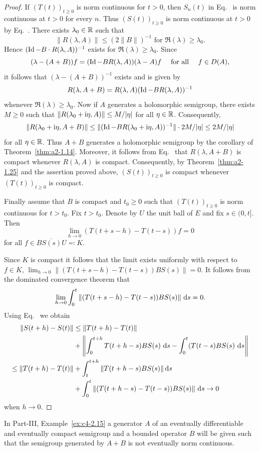\begin{proof}
If\/ $(T(t))_{t \geq 0}$ is norm continuous for $t > 0$, then $S_{n}(t)$ in Eq.~ is norm continuous at $t > 0$ for every $n$.
Thus $(S(t))_{t \geq 0}$ is norm continuous at $t > 0$ by Eq.~.
There exists $\lambda_{0} \in \mathbb{R}$ such that 
%
\[
	\|R(\lambda,A)\| \leq (2\|B\|)^{-1} \text{ for } \Re(\lambda) \geq \lambda_{0} .
\]
%
Hence $(\operatorname{Id} - B \cdot R(\lambda,A))^{-1}$ exists for $\Re(\lambda) \geq \lambda_{0}$.
Since 
\[
(\lambda -(A+B))f = (\operatorname{Id} - BR(\lambda,A))(\lambda - A)f  \quad \text{ for all } \quad f \in D(A),
\]
it follows that $(\lambda-(A+B))^{-1}$ exists and is given by
\begin{equation}\label{eq:a2-1.12}
    R(\lambda,A+B) = R(\lambda,A)(\operatorname{Id}-BR(\lambda,A))^{-1}
\end{equation}
whenever $\Re(\lambda) \geq \lambda_{0}$.
Now if\/ $A$ generates a holomorphic semigroup, there exists $M \geq 0$ such that $\|R(\lambda_{0}+\im\eta,A)\| \leq M/|\eta|$ for all $\eta \in \mathbb{R}$.
Consequently, 
\[
\|R(\lambda_{0}+\im\eta,A+B)\| \leq \|(\Id-BR(\lambda_{0} + \iu \eta,A))^{-1}\| \cdot 2M/|\eta| \leq 2M/|\eta|
\]
for all $\eta \in \mathbb{R}$.
Thus $A + B$ generates a holomorphic semigroup by the corollary of Theorem~\ref{thm:a2-1.14}.
Moreover, it follows from Eq.~  that $R(\lambda,A+B)$ is compact whenever $R(\lambda,A)$  is compact.
Consequently, by Theorem~\ref{thm:a2-1.25} and the  assertion proved above, $(S(t))_{t \geq 0}$ is compact whenever $(T(t))_{t \geq 0}$ is compact.

Finally assume that $B$ is compact and $t_{0} \geq 0$ such that $(T(t))_{t \geq 0}$ 
is norm continuous for $t > t_{0}$.
Fix $t > t_{0}$.
Denote by $U$ the unit ball of\/ $E$ and fix $s \in (0,t]$.
Then
\[
    \lim_{h \to 0} (T(t+s-h) - T(t-s))f = 0
\]
for all $f \in \overline{BS(s)U} \eqqcolon K$.

Since $K$ is compact it follows that the limit exists uniformly with respect to $f \in K$, \ie  
$\lim_{h \to 0} \|(T(t+s-h) - T(t-s))BS(s)\| = 0$.
It follows from the dominated convergence theorem that
\begin{equation}\label{eq:a2-1.13}
    \lim_{h \to 0} \int_{0}^{t} \|(T(t+s-h) - T(t-s))BS(s)\|\, \mathop{}\!\mathrm{d}{s} = 0.
\end{equation}
Using  Eq.~  we obtain 
\begin{align*}
	\|S(t+h) - S(t)\| &\leq \|T(t+h) - T(t)\|   \\
	&+  \left\| \int_{0}^{t+h} T(t+h-s)BS(s)\, \ds 
	-  \int_{0}^{t} (T(t-s)BS(s)\, \ds \right\|  \\
	\leq \|T(t+h) - T(t)\| &+ \int_{t}^{t+h} \|T(t+h-s)BS(s)\| \ds    \\ 
	&+ \int_{0}^{t} \|(T(t+h-s) - T(t-s))BS(s)\|\, \ds \to 0 
\end{align*}
when  $h \to 0$. 	
\end{proof}
In Part-III, Example~\ref{ex:c4-2.15} a generator $A$ of an eventually differentiable and eventually compact semigroup and a bounded operator $B$ will be given such that the semigroup generated by $A+B$ is not eventually norm continuous.


